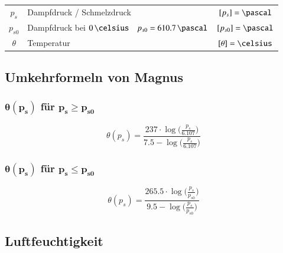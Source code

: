\begin{tabular}{c l c}
	$p_s$ 		& Dampfdruck / Schmelzdruck 									& $[p_s] = \pascal$ 	\\
	$p_{s0}$ 	& Dampfdruck bei $0\, \celsius \quad p_{s0} = 610.7 \, \pascal$	& $[p_{s0}] = \pascal$	\\
	$\theta$ 	& Temperatur 													& $[\theta] = \celsius$
	
\end{tabular}


\subsection{Umkehrformeln von Magnus}

\begin{minipage}[t]{0.48\columnwidth}
	\subsubsection{$\boldsymbol{\theta(p_s)}$ für $\boldsymbol{p_s \geq p_{s0}}$}

	\vspace{-0.2cm}

	$$ \boxed{ \theta(p_s) = \frac{237 \cdot \log \big( \frac{p_s}{6.107} \big) }{7.5 - \log \big( \frac{p_s}{6.107} \big)} } $$	
\end{minipage}
\hfill
\begin{minipage}[t]{0.48\columnwidth}
	\subsubsection{$\boldsymbol{\theta(p_s)}$ für $\boldsymbol{p_s \leq p_{s0}}$}

	\vspace{-0.2cm}

	$$ \boxed{ \theta(p_s) = \frac{265.5 \cdot \log \big( \frac{p_s}{p_{s0}} \big)  }{9.5 - \log \big( \frac{p_s}{p_{s0}} \big)} } $$
\end{minipage}


\subsection{Luftfeuchtigkeit}

